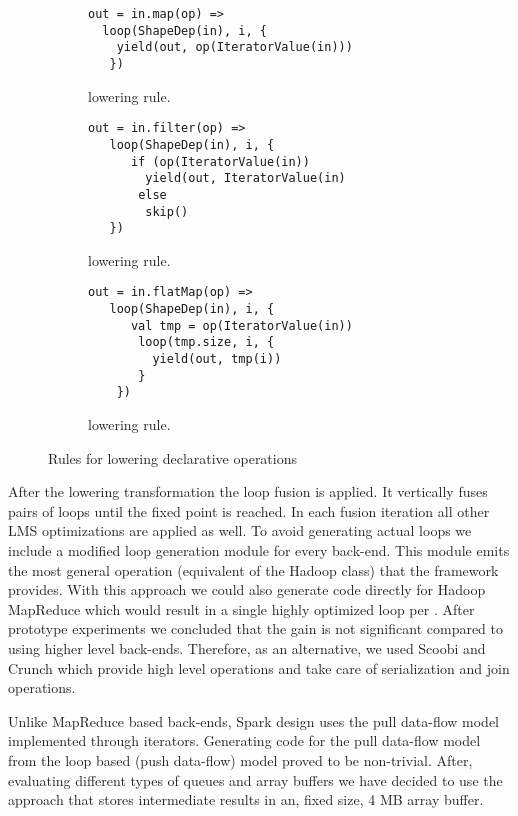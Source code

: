 \begin{figure}

\begin{subfigure}[b]{.5\linewidth}
\begin{lstlisting}
out = in.map(op) =>
  loop(ShapeDep(in), i, {
    yield(out, op(IteratorValue(in)))
   })
\end{lstlisting}
\caption{ lowering rule.}
\end{subfigure}
  \begin{subfigure}[b]{.5\linewidth}
   \begin{lstlisting}
out = in.filter(op) =>
   loop(ShapeDep(in), i, {
      if (op(IteratorValue(in)) 
        yield(out, IteratorValue(in) 
       else
        skip()
   })
\end{lstlisting}
\caption{ lowering rule.}  
\end{subfigure}
\begin{subfigure}[b]{.5\linewidth}
\begin{lstlisting}
out = in.flatMap(op) =>
   loop(ShapeDep(in), i, { 
      val tmp = op(IteratorValue(in))
       loop(tmp.size, i, {
         yield(out, tmp(i))
       }
    })
 \end{lstlisting}
    \caption{ lowering rule.}
  \end{subfigure}
\caption{Rules for lowering declarative  operations}
  \label{lst:fusion-rules}
\end{figure}

After the lowering transformation the loop fusion is applied. It vertically fuses pairs of loops until the fixed point is reached. In each fusion iteration all other LMS optimizations are applied as well. To avoid generating actual  loops we include a modified loop generation module for every back-end. This module emits the most general operation (equivalent of the Hadoop  class) that the framework provides. With this approach we could also generate code directly for Hadoop MapReduce which would result in a single highly optimized loop per . After prototype experiments we concluded that the gain is not significant compared to using higher level back-ends. Therefore, as an alternative, we used Scoobi and Crunch which provide high level operations and take care of serialization and join operations.    

Unlike MapReduce based back-ends, Spark design uses the pull data-flow model implemented through iterators. Generating code for the pull data-flow model from the loop based (push data-flow) model proved to be non-trivial. After, evaluating different types of queues and array buffers we have decided to use the approach that stores intermediate results in an, fixed size, 4 MB array buffer.